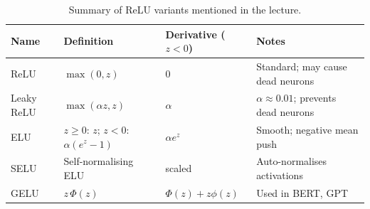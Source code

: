 \documentclass[12pt,a4paper]{article}
\begin{document}
\begin{table}[htbp]
\centering
\caption{Summary of ReLU variants mentioned in the lecture.}
\label{tab:relu_variants}
\begin{tabular}{@{}llll@{}}
\toprule
\textbf{Name} & \textbf{Definition} & \textbf{Derivative ($z<0$)}
              & \textbf{Notes} \\
\midrule
ReLU & $\max(0,z)$ & 0 & Standard; may cause dead neurons \\
Leaky ReLU & $\max(\alpha z, z)$ & $\alpha$ & $\alpha \approx 0.01$;
              prevents dead neurons \\
ELU & $z \geq 0$: $z$; $z<0$: $\alpha(e^z-1)$ & $\alpha e^z$ &
      Smooth; negative mean push \\
SELU & Self-normalising ELU & scaled & Auto-normalises activations \\
GELU & $z\,\Phi(z)$ & $\Phi(z) + z\phi(z)$ &
       Used in BERT, GPT \\
\bottomrule
\end{tabular}
\end{table}
\end{document}
